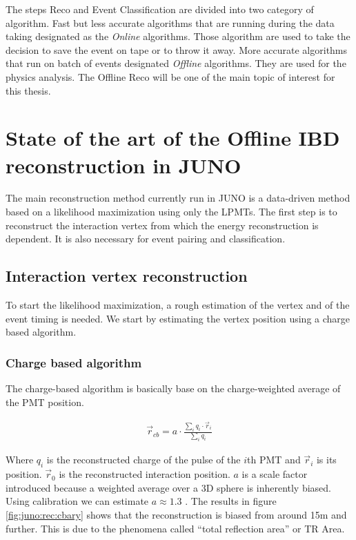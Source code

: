 The steps Reco and Event Classification are divided into two category of algorithm. Fast but less accurate algorithms that are running during the data taking designated as the \textit{Online} algorithms. Those algorithm are used to take the decision to save the event on tape or to throw it away. More accurate algorithms that run on batch of events designated \textit{Offline} algorithms. They are used for the physics analysis. The Offline Reco will be one of the main topic of interest for this thesis.

\section{State of the art of the Offline IBD reconstruction in JUNO}
\label{sec:juno:reco}

The main reconstruction method currently run in JUNO is a data-driven method based on a likelihood maximization \cite{wu_new_2019, huang_improving_2021} using only the LPMTs. The first step is to reconstruct the interaction vertex from which the energy reconstruction is dependent. It is also necessary for event pairing and classification.

\subsection{Interaction vertex reconstruction}

To start the likelihood maximization, a rough estimation of the vertex and of the event timing is needed. We start by estimating the vertex position using a charge based algorithm.

\subsubsection{Charge based algorithm}

The charge-based algorithm is basically base on the charge-weighted average of the PMT position.

\begin{align}
  \vec{r}_{cb} = a\cdot\frac{\sum_i q_i \cdot \vec{r}_i}{\sum_i q_i}
\end{align}

Where $q_i$ is the reconstructed charge of the pulse of the $i$th PMT and $\vec{r}_i$ is its position. $\vec{r}_0$ is the reconstructed interaction position. $a$ is a scale factor introduced because a weighted average over a 3D sphere is inherently biased. Using calibration we can estimate $a \approx 1.3$ \cite{li_event_2021}. The results in figure \ref{fig:juno:rec:cbary} shows that the reconstruction is biased from around 15m and further. This is due to the phenomena called ``total reflection area'' or TR Area.

